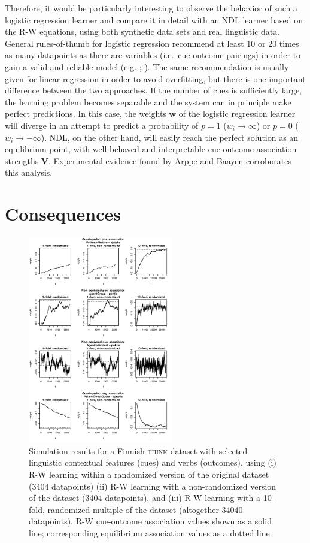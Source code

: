 \documentclass[conference]{IEEEtran}
\begin{document}
Therefore, it would be particularly interesting to observe the behavior of such a logistic regression learner and compare it in detail with an NDL learner based on the R-W equations, using both synthetic data sets and real linguistic data. General rules-of-thumb for logistic regression recommend at least 10 or 20 times as many datapoints as there are variables (i.e.\ cue-outcome pairings) in order to gain a valid and reliable model (e.g. \cite{peduzzi1996}; \cite[p.\ 116]{arppe2008}). The same recommendation is usually given for linear regression in order to avoid overfitting, but there is one important difference between the two approaches. If the number of cues is sufficiently large, the learning problem becomes separable and the system can in principle make perfect predictions. In this case, the weights $\mathbf{w}$ of the logistic regression learner will diverge in an attempt to predict a probability of $p=1$ ($w_i \to \infty$) or $p=0$ ($w_i\to -\infty$). NDL, on the other hand, will easily reach the perfect solution as an equilibrium point, with well-behaved and interpretable cue-outcome association strengths $\mathbf{V}$. Experimental evidence found by Arppe and Baayen \cite{arppebaayen2011} corroborates this analysis.


\section{Consequences}
\label{sec:consequence}


\begin{figure}[!t]
\centering
\includegraphics[width=2.5in]{QITL6_abstract_final-think_conv.png}
\caption{Simulation results for a Finnish \textsc{think} dataset with selected linguistic contextual features (cues) and verbs (outcomes), using (i) R-W learning within a randomized version of the original dataset (3404 datapoints) (ii) R-W learning with a non-randomized version of the dataset (3404 datapoints), and (iii) R-W learning with a 10-fold, randomized multiple of the dataset (altogether 34040 datapoints). R-W cue-outcome association values shown as a solid line; corresponding equilibrium association values as a dotted line.}
\label{think_weights}
\end{figure}
\end{document}
